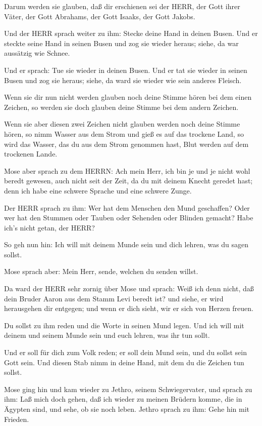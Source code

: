  Darum werden sie glauben, daß dir erschienen sei der HERR,
der Gott ihrer Väter, der Gott Abrahams, der Gott Isaaks, der Gott
Jakobs.

 Und der HERR sprach weiter zu ihm: Stecke deine Hand in
deinen Busen. Und er steckte seine Hand in seinen Busen und zog sie
wieder heraus; siehe, da war aussätzig wie Schnee.

 Und er sprach: Tue sie wieder in deinen Busen. Und er tat
sie wieder in seinen Busen und zog sie heraus; siehe, da ward sie wieder
wie sein anderes Fleisch.

 Wenn sie dir nun nicht werden glauben noch deine Stimme
hören bei dem einen Zeichen, so werden sie doch glauben deine Stimme bei
dem andern Zeichen.

 Wenn sie aber diesen zwei Zeichen nicht glauben werden noch
deine Stimme hören, so nimm Wasser aus dem Strom und gieß es auf das
trockene Land, so wird das Wasser, das du aus dem Strom genommen hast,
Blut werden auf dem trockenen Lande.

 Mose aber sprach zu dem HERRN: Ach mein Herr, ich bin je
und je nicht wohl beredt gewesen, auch nicht seit der Zeit, da du mit
deinem Knecht geredet hast; denn ich habe eine schwere Sprache und eine
schwere Zunge.

 Der HERR sprach zu ihm: Wer hat dem Menschen den Mund
geschaffen? Oder wer hat den Stummen oder Tauben oder Sehenden oder
Blinden gemacht? Habe ich's nicht getan, der HERR?

 So geh nun hin: Ich will mit deinem Munde sein und dich
lehren, was du sagen sollst.

 Mose sprach aber: Mein Herr, sende, welchen du senden
willst.

 Da ward der HERR sehr zornig über Mose und sprach: Weiß
ich denn nicht, daß dein Bruder Aaron aus dem Stamm Levi beredt ist? und
siehe, er wird herausgehen dir entgegen; und wenn er dich sieht, wir er
sich von Herzen freuen.

 Du sollst zu ihm reden und die Worte in seinen Mund legen.
Und ich will mit deinem und seinem Munde sein und euch lehren, was ihr
tun sollt.

 Und er soll für dich zum Volk reden; er soll dein Mund
sein, und du sollst sein Gott sein.  Und diesen Stab nimm
in deine Hand, mit dem du die Zeichen tun sollst.

 Mose ging hin und kam wieder zu Jethro, seinem
Schwiegervater, und sprach zu ihm: Laß mich doch gehen, daß ich wieder
zu meinen Brüdern komme, die in Ägypten sind, und sehe, ob sie noch
leben. Jethro sprach zu ihm: Gehe hin mit Frieden.

